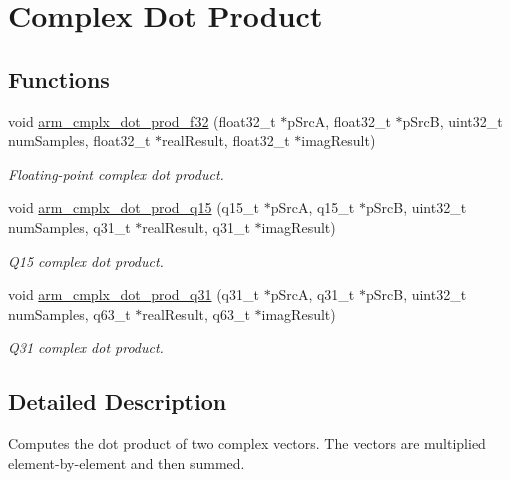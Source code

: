\hypertarget{group__cmplx__dot__prod}{\section{Complex Dot Product}
\label{group__cmplx__dot__prod}
}
\subsection*{Functions}
\begin{DoxyCompactItemize}
\item 
void \hyperlink{group__cmplx__dot__prod_gadcfaf567a25eb641da4043eafb9bb076}{arm\-\_\-cmplx\-\_\-dot\-\_\-prod\-\_\-f32} (float32\-\_\-t $\ast$p\-Src\-A, float32\-\_\-t $\ast$p\-Src\-B, uint32\-\_\-t num\-Samples, float32\-\_\-t $\ast$real\-Result, float32\-\_\-t $\ast$imag\-Result)
\begin{DoxyCompactList}\small\item\em Floating-\/point complex dot product. \end{DoxyCompactList}\item 
void \hyperlink{group__cmplx__dot__prod_ga2b08b5e8001d2c15204639d00893fc70}{arm\-\_\-cmplx\-\_\-dot\-\_\-prod\-\_\-q15} (q15\-\_\-t $\ast$p\-Src\-A, q15\-\_\-t $\ast$p\-Src\-B, uint32\-\_\-t num\-Samples, q31\-\_\-t $\ast$real\-Result, q31\-\_\-t $\ast$imag\-Result)
\begin{DoxyCompactList}\small\item\em Q15 complex dot product. \end{DoxyCompactList}\item 
void \hyperlink{group__cmplx__dot__prod_ga5b731a59db062a9ad84562ef68a6c8af}{arm\-\_\-cmplx\-\_\-dot\-\_\-prod\-\_\-q31} (q31\-\_\-t $\ast$p\-Src\-A, q31\-\_\-t $\ast$p\-Src\-B, uint32\-\_\-t num\-Samples, q63\-\_\-t $\ast$real\-Result, q63\-\_\-t $\ast$imag\-Result)
\begin{DoxyCompactList}\small\item\em Q31 complex dot product. \end{DoxyCompactList}\end{DoxyCompactItemize}


\subsection{Detailed Description}
Computes the dot product of two complex vectors. The vectors are multiplied element-\/by-\/element and then summed.

